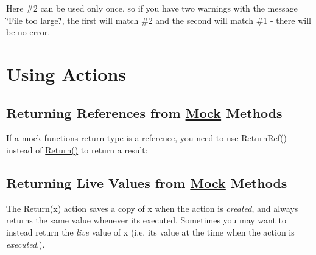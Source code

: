 Here \#2 can be used only once, so if you have two warnings with the message {\ttfamily \char`\"{}\+File too large.\char`\"{}}, the first will match \#2 and the second will match \#1 -\/ there will be no error.

\section*{Using Actions}

\subsection*{Returning References from \mbox{\hyperlink{class_mock}{Mock}} Methods}

If a mock function\textquotesingle{}s return type is a reference, you need to use {\ttfamily \mbox{\hyperlink{namespacetesting_ac17089d5ca6377944d3792fbdc5c5d9b}{Return\+Ref()}}} instead of {\ttfamily \mbox{\hyperlink{namespacetesting_adae3994eb444d1ad2dd602454b854663}{Return()}}} to return a result\+:


\begin{DoxyCode}{0}
\DoxyCodeLine{}
\DoxyCodeLine{ \textcolor{keyword}{public}:}
\DoxyCodeLine{\};}
\DoxyCodeLine{}
\end{DoxyCode}


\subsection*{Returning Live Values from \mbox{\hyperlink{class_mock}{Mock}} Methods}

The {\ttfamily Return(x)} action saves a copy of {\ttfamily x} when the action is {\itshape created}, and always returns the same value whenever it\textquotesingle{}s executed. Sometimes you may want to instead return the {\itshape live} value of {\ttfamily x} (i.\+e. its value at the time when the action is {\itshape executed}.).

